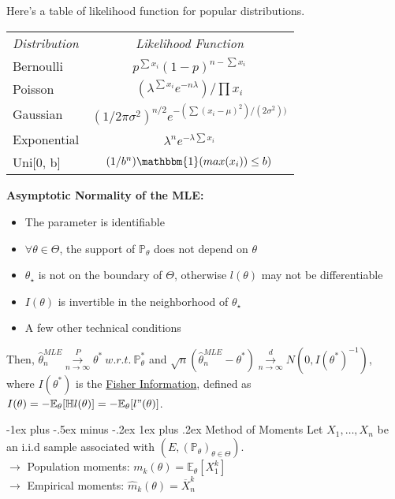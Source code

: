 \documentclass[landscape]{article}
\makeatletter
\renewcommand{\subsubsection}{\@startsection{subsubsection}{3}{0mm}%
                                {-1ex plus -.5ex minus -.2ex}%
                                {1ex plus .2ex}%
                                {\normalfont\small\bfseries}}
\makeatother
\begin{document}
\begin{multicols}{3}
Here's a table  of likelihood function for popular distributions.\\

\begin{tabular}{l c}
    \textit{Distribution} &\textit{Likelihood Function}\\
    Bernoulli & $p^{\sum x_i} (1-p)^{n- \sum x_i}$\\
    Poisson & $(\lambda^{\sum x_i} e^{-n\lambda})/ \prod x_i$\\
    Gaussian & $(1/2 \pi \sigma^2)^{n/2} e^{-(\sum(x_i - \mu)^2)/(2\sigma^2))}$\\
    Exponential & $\lambda^n e^{-\lambda \sum x_i}$\\
    Uni[0, b] & $(1/b^n) \mathbbm{1}(max(x_i)) \leq b)$
\end{tabular}
\newline

\textbf{Asymptotic Normality of the MLE:} 
\begin{itemize}
    \item The parameter is identifiable
    \item $\forall \theta \in \Theta$, the support of $\mathbb{P}_\theta$ does not depend on $\theta$
    \item $\theta_\star$ is not on the boundary of $\Theta$, otherwise $l(\theta)$ may not be differentiable
    \item $I(\theta)$ is invertible in the neighborhood of $\theta_\star$
    \item A few other technical conditions
\end{itemize}

Then, $\widehat{\theta}^{MLE}_{n} \overset{P}{\underset{n \to \infty}{\to}} \theta^* \ w.r.t. \ \mathbb{P}_\theta^{*}$ and  
$\sqrt{n}(\widehat{\theta}^{MLE}_n - \theta^*) \overset{d}{\underset{n\to \infty}{\to}} N(0, I(\theta^*)^{-1})$, 
where $I(\theta^*)$ is the \underline{Fisher Information}, defined as $I(\theta) = -\mathbb{E}_\theta[\mathbb{H}l(\theta)] = -\mathbb{E}_\theta[l"(\theta)]$.

\subsubsection{Method of Moments}
Let $X_1, \dots, X_n$ be an i.i.d sample associated with $(E, (\mathbb{P}_\theta)_{\theta \in \Theta})$.\\
$\longrightarrow$ Population moments: $m_k(\theta) = \mathbb{E}_\theta [X_1^k]$\\
$\longrightarrow$ Empirical moments: $ \widehat{m}_k (\theta) = \overline{X}_n^k$\\


\end{multicols}
\end{document}
